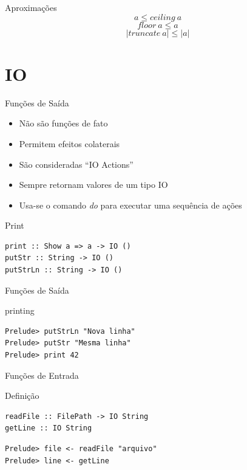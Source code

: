 \documentclass{beamer}
\begin{document}
			\begin{frame}{Aproximações}
			 \[ a \leq ceiling~ a\]
			 \[ floor~ a \leq a\]
			 \[ \left|truncate~ a\right| \leq \left|a\right|\]
			\end{frame}		
	
	\section{IO}
	
	\begin{frame}{}
	\end{frame}
	
		\begin{frame}[fragile]{Funções de Saída}
		 \begin{itemize}
		  \item Não são funções de fato
		  \item Permitem efeitos colaterais
		  \item São consideradas ``IO Actions''
		  \item Sempre retornam valores de um tipo IO
		  \item Usa-se o comando \textit{do} para executar uma sequência de ações
		 \end{itemize}
		 
		 \begin{block}{Print}
		  \begin{lstlisting}
print :: Show a => a -> IO ()
putStr :: String -> IO ()
putStrLn :: String -> IO ()
		  \end{lstlisting}
		 \end{block}
		\end{frame}
		
		\begin{frame}[fragile]{Funções de Saída}
		 \begin{block}{printing}
		  \begin{lstlisting}
Prelude> putStrLn "Nova linha"
Prelude> putStr "Mesma linha"
Prelude> print 42
		  \end{lstlisting}
		 \end{block}
		\end{frame}
		
		\begin{frame}[fragile]{Funções de Entrada}

		 \begin{block}{Definição}
		  \begin{lstlisting}
readFile :: FilePath -> IO String
getLine :: IO String
		  \end{lstlisting}
		 \end{block}
		 
		 \begin{block}{}
		  \begin{lstlisting}
Prelude> file <- readFile "arquivo"
Prelude> line <- getLine
		  \end{lstlisting}
		 \end{block}		 
		\end{frame}
		
\end{document}
